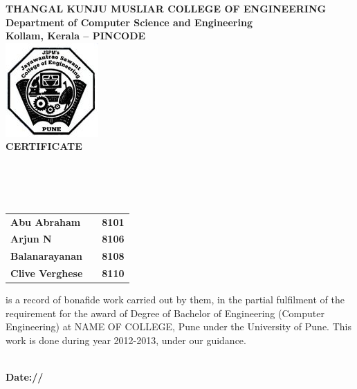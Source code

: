 \begin{center}
\thispagestyle{empty}

\LARGE{\textbf{THANGAL KUNJU MUSLIAR COLLEGE OF ENGINEERING}} \\ 
\large{\textbf{Department of Computer Science and Engineering}}\\
\large{\textbf{Kollam, Kerala – PINCODE}}\\[0.5cm]

\includegraphics[scale=0.5]{project/images/jscoe_logo}\\[0.5cm]

{\Huge \textbf{CERTIFICATE}}\\[0.5cm]
\end{center}
\linespread{1.13}
\large{\\[0.2cm]
\textbf{\Large{}}\\[0.2cm]
\\[0.2cm]
\begin{table}[h]
\centering
\large{
\begin{tabular}{>{\bfseries}lc>{\bfseries}r}
Abu Abraham & & 8101\\Arjun N & & 8106\\Balanarayanan & & 8108\\Clive Verghese & & 8110\\
\end{tabular}}
\end{table}
 is a record of bonafide work carried out by them, in the partial
 fulfilment of the requirement for the award of Degree of Bachelor of
 Engineering (Computer Engineering) at NAME OF COLLEGE, Pune under the 
 University of Pune. This work is done
 during year 2012-2013, under our guidance.}\\[0.5cm]
\large{\textbf{Date:\hspace*{1.0cm}/\hspace*{1.0cm}/}}\\

